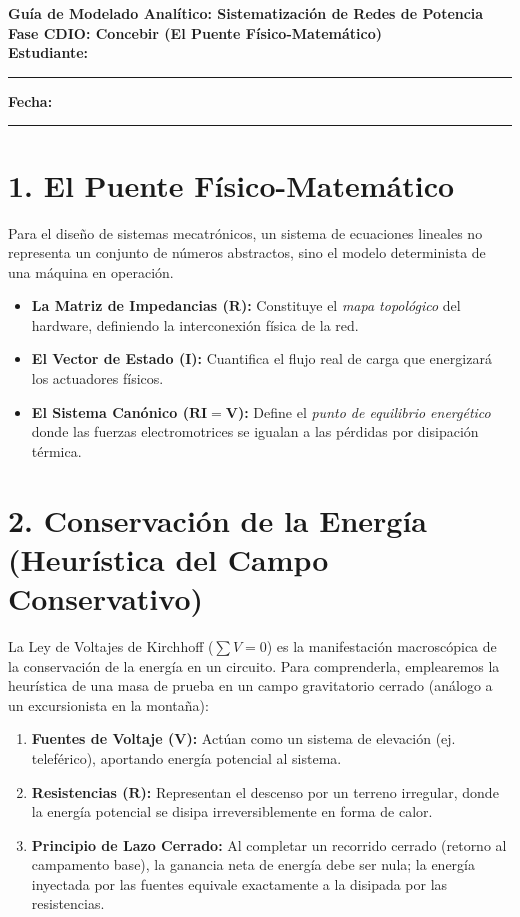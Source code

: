 \documentclass[11pt,a4paper]{article}
\begin{document}
\begin{center}
    {\Large \textbf{\textcolor{UCBblue}{Guía de Modelado Analítico: Sistematización de Redes de Potencia}}}\\
    \vspace{0.3cm}
    {\large \textbf{Fase CDIO: Concebir (El Puente Físico-Matemático)}}\\
    \vspace{0.5cm}
    \textbf{Estudiante:} \rule{8cm}{0.4pt} \quad \textbf{Fecha:} \rule{3cm}{0.4pt}
\end{center}

\vspace{0.5cm}

\section*{1. El Puente Físico-Matemático}
Para el diseño de sistemas mecatrónicos, un sistema de ecuaciones lineales no representa un conjunto de números abstractos, sino el modelo determinista de una máquina en operación.
\begin{itemize}
    \item \textbf{La Matriz de Impedancias ($\mathbf{R}$):} Constituye el \textit{mapa topológico} del hardware, definiendo la interconexión física de la red.
    \item \textbf{El Vector de Estado ($\mathbf{I}$):} Cuantifica el flujo real de carga que energizará los actuadores físicos.
    \item \textbf{El Sistema Canónico ($\mathbf{R}\mathbf{I} = \mathbf{V}$):} Define el \textit{punto de equilibrio energético} donde las fuerzas electromotrices se igualan a las pérdidas por disipación térmica.
\end{itemize}

\section*{2. Conservación de la Energía (Heurística del Campo Conservativo)}
La Ley de Voltajes de Kirchhoff ($\sum V = 0$) es la manifestación macroscópica de la conservación de la energía en un circuito. Para comprenderla, emplearemos la heurística de una masa de prueba en un campo gravitatorio cerrado (análogo a un excursionista en la montaña):
\begin{enumerate}
    \item \textbf{Fuentes de Voltaje ($\mathbf{V}$):} Actúan como un sistema de elevación (ej. teleférico), aportando energía potencial al sistema.
    \item \textbf{Resistencias ($\mathbf{R}$):} Representan el descenso por un terreno irregular, donde la energía potencial se disipa irreversiblemente en forma de calor.
    \item \textbf{Principio de Lazo Cerrado:} Al completar un recorrido cerrado (retorno al campamento base), la ganancia neta de energía debe ser nula; la energía inyectada por las fuentes equivale exactamente a la disipada por las resistencias.
\end{enumerate}
\end{document}
